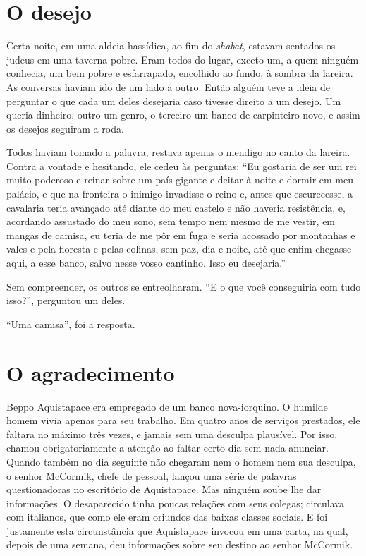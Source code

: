 \section{O desejo }

Certa noite, em uma aldeia hassídica, ao fim do \emph{shabat}, estavam
sentados os judeus em uma taverna pobre. Eram todos do lugar, exceto um,
a quem ninguém conhecia, um bem pobre e esfarrapado, encolhido ao fundo,
à sombra da lareira. As conversas haviam ido de um lado a outro. Então
alguém teve a ideia de perguntar o que cada um deles desejaria caso
tivesse direito a um desejo. Um queria dinheiro, outro um genro, o
terceiro um banco de carpinteiro novo, e assim os desejos seguiram a
roda.

Todos haviam tomado a palavra, restava apenas o mendigo no canto da
lareira. Contra a vontade e hesitando, ele cedeu às perguntas: ``Eu
gostaria de ser um rei muito poderoso e reinar sobre um país gigante e
deitar à noite e dormir em meu palácio, e que na fronteira o inimigo
invadisse o reino e, antes que escurecesse, a cavalaria teria avançado
até diante do meu castelo e não haveria resistência, e, acordando
assustado do meu sono, sem tempo nem mesmo de me vestir, em mangas de
camisa, eu teria de me pôr em fuga e seria acossado por montanhas e
vales e pela floresta e pelas colinas, sem paz, dia e noite, até que
enfim chegasse aqui, a esse banco, salvo nesse vosso cantinho. Isso eu
desejaria.''

Sem compreender, os outros se entreolharam. ``E o que você conseguiria
com tudo isso?'', perguntou um deles.

``Uma camisa'', foi a resposta.

\section{O agradecimento}

Beppo Aquistapace era empregado de um banco nova-iorquino. O humilde
homem vivia apenas para seu trabalho. Em quatro anos de serviços
prestados, ele faltara no máximo três vezes, e jamais sem uma desculpa
plausível. Por isso, chamou obrigatoriamente a atenção ao faltar certo
dia sem nada anunciar. Quando também no dia seguinte não chegaram nem o
homem nem sua desculpa, o senhor McCormik, chefe de pessoal, lançou uma
série de palavras questionadoras no escritório de Aquistapace. Mas
ninguém soube lhe dar informações. O desaparecido tinha poucas relações
com seus colegas; circulava com italianos, que como ele eram oriundos
das baixas classes sociais. E foi justamente esta circunstância que
Aquistapace invocou em uma carta, na qual, depois de uma semana, deu
informações sobre seu destino ao senhor McCormik.

